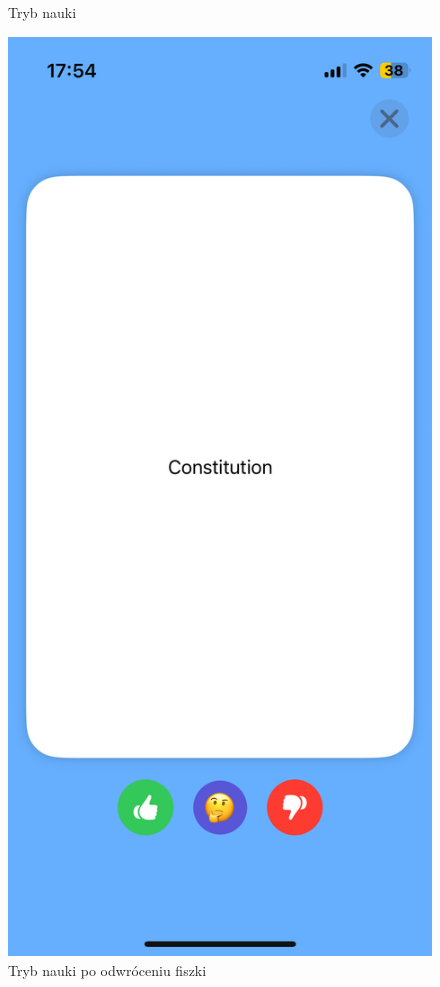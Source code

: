 \documentclass[final,a4paper,openany,12pt]{mwbk}
\begin{document}
\begin{figure}[h]
\begin{minipage}{0.5\textwidth}
  \caption{Tryb nauki}
  \label{fig:fishky5}
\end{minipage}%
\begin{minipage}{0.5\textwidth}
  \centering
  \includegraphics[width=.75\linewidth]{img/fishky6.PNG}
  \caption{Tryb nauki po odwróceniu fiszki}
  \label{fig:fishky6}
\end{minipage}
\end{figure}
\end{document}
